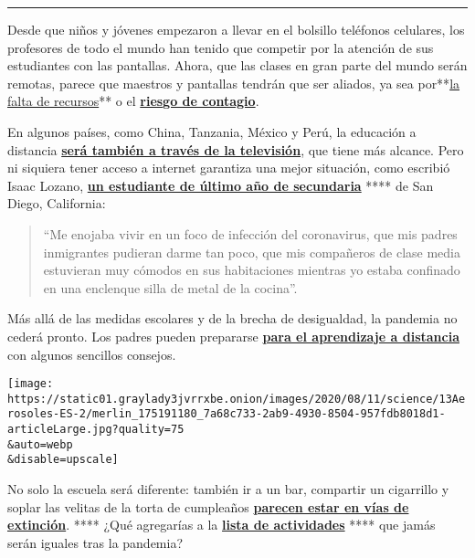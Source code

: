 \begin{center}\rule{0.5\linewidth}{\linethickness}\end{center}

Desde que niños y jóvenes empezaron a llevar en el bolsillo teléfonos
celulares, los profesores de todo el mundo han tenido que competir por
la atención de sus estudiantes con las pantallas. Ahora, que las clases
en gran parte del mundo serán remotas, parece que maestros y pantallas
tendrán que ser aliados, ya sea
por**\href{https://www.nytimes3xbfgragh.onion/es/2020/08/07/espanol/mundo/cierre-escuela-coronavirus-kenia.html}{la
falta de recursos}** o el
\textbf{\href{https://www.nytimes3xbfgragh.onion/es/2020/08/06/espanol/mundo/abrir-escuelas-israel-coronavirus.html}{riesgo
de contagio}}.

En algunos países, como China, Tanzania, México y Perú, la educación a
distancia
\textbf{\href{https://www.nytimes3xbfgragh.onion/es/2020/08/17/espanol/educacion-television.html}{será
también a través de la televisión}}, que tiene más alcance. Pero ni
siquiera tener acceso a internet garantiza una mejor situación, como
escribió Isaac Lozano,
\textbf{\href{https://www.nytimes3xbfgragh.onion/es/2020/08/17/espanol/opinion/covid-regreso-clases-estudiante.htm}{un
estudiante de último año de secundaria}} **** de San Diego, California:

\begin{quote}
``Me enojaba vivir en un foco de infección del coronavirus, que mis
padres inmigrantes pudieran darme tan poco, que mis compañeros de clase
media estuvieran muy cómodos en sus habitaciones mientras yo estaba
confinado en una enclenque silla de metal de la cocina''.
\end{quote}

Más allá de las medidas escolares y de la brecha de desigualdad, la
pandemia no cederá pronto. Los padres pueden prepararse
\textbf{\href{https://www.nytimes3xbfgragh.onion/es/2020/08/12/espanol/curso-escolar-en-linea.html}{para
el aprendizaje a distancia}} con algunos sencillos consejos.

\texttt{[image: https://static01.graylady3jvrrxbe.onion/images/2020/08/11/science/13Aerosoles-ES-2/merlin\_175191180\_7a68c733-2ab9-4930-8504-957fdb8018d1-articleLarge.jpg?quality=75\\\&auto=webp\\\&disable=upscale]}

No solo la escuela será diferente: también ir a un bar, compartir un
cigarrillo y soplar las velitas de la torta de cumpleaños
\textbf{\href{https://www.nytimes3xbfgragh.onion/es/2020/08/15/espanol/ciencia-y-tecnologia/coronavirus-actividades-prohibidas.html}{parecen
estar en vías de extinción}}. **** ¿Qué agregarías a la
\textbf{\href{https://www.nytimes3xbfgragh.onion/es/2020/08/15/espanol/ciencia-y-tecnologia/coronavirus-actividades-prohibidas.html\#commentsContainer}{lista
de actividades}} **** que jamás serán iguales tras la pandemia?

